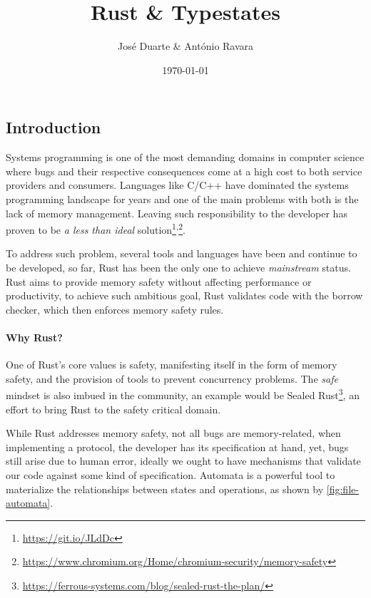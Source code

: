 \documentclass[a4paper, 10pt]{article}
\title{Rust \& Typestates}
\date{\today}
\author{José Duarte \& António Ravara}
\begin{document}
\maketitle

\subsection*{Introduction}

Systems programming is one of the most demanding domains in computer science where
bugs and their respective consequences come at a high cost to both service providers and consumers.
Languages like C/C++ have dominated the systems programming landscape for years and
one of the main problems with both is the lack of memory management.
Leaving such responsibility to the developer has proven to be \emph{a less than ideal}
solution\footnote{\url{https://git.io/JLdDc}}\textsuperscript{,}\footnote{\url{https://www.chromium.org/Home/chromium-security/memory-safety}}.

To address such problem, several tools and languages have been and continue to be developed,
so far, Rust has been the only one to achieve \emph{mainstream} status.
Rust aims to provide memory safety without affecting performance or productivity,
to achieve such ambitious goal, Rust validates code with the borrow checker, which then enforces memory safety rules.

\paragraph{Why Rust?}

One of Rust's core values is safety,
manifesting itself in the form of memory safety,
and the provision of tools to prevent concurrency problems.
The \emph{safe} mindset is also imbued in the community,
an example would be Sealed Rust\footnote{\url{https://ferrous-systems.com/blog/sealed-rust-the-plan/}},
an effort to bring Rust to the safety critical domain.

While Rust addresses memory safety, not all bugs are memory-related,
when implementing a protocol, the developer has its specification at hand, yet, bugs still arise due to human error,
ideally we ought to have mechanisms that validate our code against some kind of specification.
Automata is a powerful tool to materialize the relationships between states and operations,
as shown by \autoref{fig:file-automata}.
\end{document}
